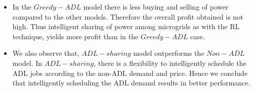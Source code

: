 \begin{itemize}
	

\item In  the $Greedy-ADL$ model there is less buying and selling of power compared to the other models.
 Therefore the overall profit obtained is not high. Thus intelligent sharing of power among microgrids as with the RL technique, yields more profit than in the $Greedy-ADL$ case. 

\item We also observe that, $ADL-sharing$ model outperforms the $Non-ADL$ model. In $ADL-sharing$, there is a flexibility to intelligently schedule the ADL jobs according to the non-ADL demand and price. 
Hence we conclude that intelligently scheduling the ADL demand results in better performance.



	

\end{itemize}
